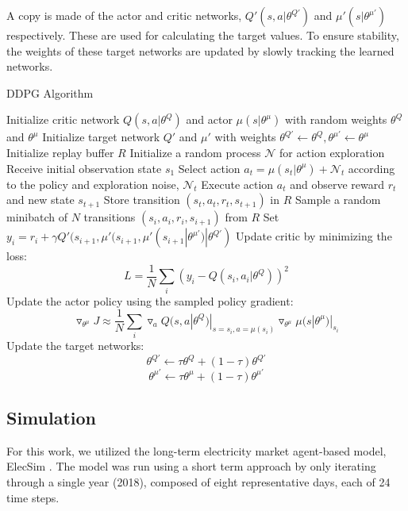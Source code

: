 A copy is made of the actor and critic networks, $Q'(s,a|\theta^{Q'})$ and $\mu'(s|\theta^{\mu'})$ respectively. These are used for calculating the target values. To ensure stability, the weights of these target networks are updated by slowly tracking the learned networks.

\begin{algorithm}
	\caption{DDPG Algorithm \cite{Hunt2016}}
	\begin{algorithmic}[1]
		\footnotesize
		\State Initialize critic network $Q(s,a|\theta^Q)$ and actor $\mu(s|\theta^\mu)$ with random weights $\theta^Q$ and $\theta^\mu$
		\State Initialize target network $Q'$ and $\mu'$ with weights $\theta^{Q'}\leftarrow\theta^Q,\theta^{\mu'}\leftarrow \theta^{\mu}$
		\State Initialize replay buffer $R$
		\State Initialize a random process $\mathcal{N}$ for action exploration
		\State Receive initial observation state $s_1$
		\State Select action $a_t=\mu(s_t|\theta^{\mu})+\mathcal{N}_t$ according to the policy and exploration noise, $\mathcal{N}_t$
		\State Execute action $a_t$ and observe reward $r_t$ and new state $s_{t+1}$
		\State Store transition $(s_t, a_t, r_t, s_{t+1})$ in $R$
		\State Sample a random minibatch of $N$ transitions $(s_i, a_i, r_i, s_{i+1})$ from $R$
		\State Set $y_i=r_i+\gamma Q'(s_{i+1},\mu'(s_{i+1},\mu'(s_{i+1}|\theta^{\mu'})|\theta^{Q'})$
		\State Update critic by minimizing the loss: $$L=\frac{1}{N}\sum_i(y_i-Q(s_i,a_i|\theta^Q))^2$$
		\State Update the actor policy using the sampled policy gradient: $$\triangledown_{\theta^\mu}J\approx \frac{1}{N}\sum_i\triangledown_a Q(s,a|\theta^Q)|_{s=s_i,a=\mu(s_i)}\triangledown_{\theta^\mu}\mu(s|\theta^\mu)|_{s_i}$$
		\State Update the target networks:
		$$\theta^{Q'}\leftarrow\tau\theta^Q+(1-\tau)\theta^{Q'}$$
		$$\theta^{\mu'}\leftarrow\tau\theta^\mu+(1-\tau)\theta^{\mu'}$$
		\EndFor
		\EndFor
	\end{algorithmic}
\end{algorithm}

\subsection{Simulation}

For this work, we utilized the long-term electricity market agent-based model, ElecSim \cite{Kell,Kell2020b}. The model was run using a short term approach by only iterating through a single year (2018), composed of eight representative days, each of 24 time steps.

